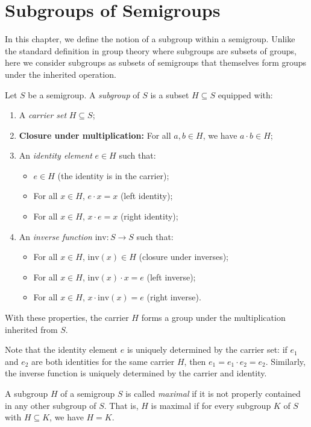 \chapter{Subgroups of Semigroups}


In this chapter, we define the notion of a subgroup within a semigroup. Unlike the standard definition in group theory where subgroups are subsets of groups, here we consider subgroups as subsets of semigroups that themselves form groups under the inherited operation.

\begin{definition}
\label{def:subgroup-of-semigroup}
Let $S$ be a semigroup. A \emph{subgroup} of $S$ is a subset $H \subseteq S$ equipped with:
\begin{enumerate}
    \item A \emph{carrier set} $H \subseteq S$;
    \item \textbf{Closure under multiplication:} For all $a, b \in H$, we have $a \cdot b \in H$;
    \item An \emph{identity element} $e \in H$ such that:
    \begin{itemize}
        \item $e \in H$ (the identity is in the carrier);
        \item For all $x \in H$, $e \cdot x = x$ (left identity);
        \item For all $x \in H$, $x \cdot e = x$ (right identity);
    \end{itemize}
    \item An \emph{inverse function} $\mathrm{inv} : S \to S$ such that:
    \begin{itemize}
        \item For all $x \in H$, $\mathrm{inv}(x) \in H$ (closure under inverses);
        \item For all $x \in H$, $\mathrm{inv}(x) \cdot x = e$ (left inverse);
        \item For all $x \in H$, $x \cdot \mathrm{inv}(x) = e$ (right inverse).
    \end{itemize}
\end{enumerate}
With these properties, the carrier $H$ forms a group under the multiplication inherited from $S$.

Note that the identity element $e$ is uniquely determined by the carrier set: if $e_1$ and $e_2$ are both identities for the same carrier $H$, then $e_1 = e_1 \cdot e_2 = e_2$. Similarly, the inverse function is uniquely determined by the carrier and identity.
\leanok
\end{definition}

\begin{definition}
\label{def:maximal-subgroup}
A subgroup $H$ of a semigroup $S$ is called \emph{maximal} if it is not properly contained in any other subgroup of $S$. That is, $H$ is maximal if for every subgroup $K$ of $S$ with $H \subseteq K$, we have $H = K$.
\leanok
{}
\end{definition}

